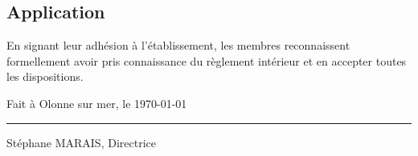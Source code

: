 \documentclass[11pt,a4paper]{article}
\begin{document}
\subsection{Application}
En signant leur adhésion à l'établissement, les membres reconnaissent formellement avoir pris connaissance du règlement intérieur et en accepter toutes les dispositions.

\vspace{10cm}

Fait à Olonne sur mer, le \today

\vspace{2cm}

\begin{flushright}
\rule{6cm}{0.5pt}

{Stéphane MARAIS, Directrice \kern 9pt}

\end{flushright}
\end{document}
